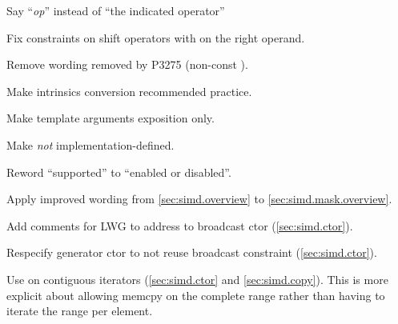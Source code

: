 \begin{revision}
\item Say “\textit{op}” instead of “the indicated operator”
\item Fix constraints on shift operators with \simdsizetype{} on the right operand.
\item Remove wording removed by P3275 (non-const ).
\item Make intrinsics conversion recommended practice.
\item Make  template arguments exposition only.
\item Make  \emph{not} implementation-defined.
\item Reword “supported” to “enabled or disabled”.
\item Apply improved wording from \ref{sec:simd.overview} to \ref{sec:simd.mask.overview}.
\item Add comments for LWG to address to broadcast ctor (\ref{sec:simd.ctor}).
\item Respecify generator ctor to not reuse broadcast constraint (\ref{sec:simd.ctor}).
\item Use  on contiguous iterators (\ref{sec:simd.ctor} and \ref{sec:simd.copy}).
  This is more explicit about allowing memcpy on the complete range rather than
  having to iterate the range per element.
\end{revision}

